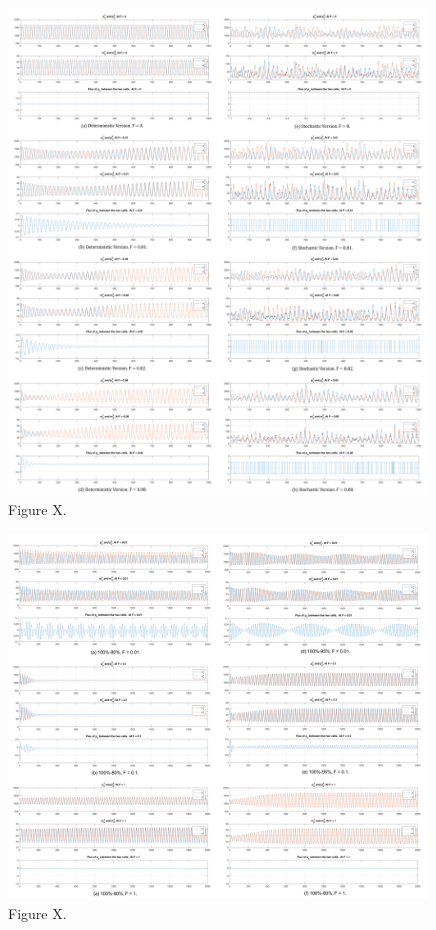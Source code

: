 \documentclass[12pt]{article}
\renewcommand{\(}{\left (}
\renewcommand{\)}{\right )}
\begin{document}
\begin{figure}[h]
    \centering
	\begin{minipage}{0.99\textwidth}
		\centering
		\includegraphics[width=0.99\textwidth]{combined_results.png}
		\caption*{\small Figure X.}
	\end{minipage}
\end{figure}



\begin{figure}[h]
    \centering
	\begin{minipage}{0.99\textwidth}
		\centering
		\includegraphics[width=0.99\textwidth]{diff_periods_combine.png}
		\caption*{\small Figure X.}
	\end{minipage}
\end{figure}
\end{document}
